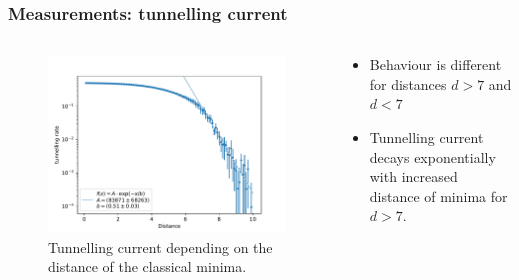 \documentclass[aspectratio=169]{beamer}
\begin{document}
\begin{frame}
	\frametitle{Measurements: tunnelling current}
	\vspace{-15px}
	\begin{columns}
		\begin{column}{0.6\textwidth}
			\begin{figure}[H]
				\centering
				\includegraphics[width=\textwidth]{../imgs/anharmonic_oscillator_lambda_parameter/track_100001000_tunnelling_current_log_fit.pdf}
				\caption{Tunnelling current depending on the distance of the classical minima.}
				\label{fig:anharmonic_oscillator_tunnelling_current}
			\end{figure}
		\end{column}
		\begin{column}{0.39\textwidth}
			\begin{itemize}
				\item Behaviour is different for distances $d > 7$ and $d < 7$
				\item Tunnelling current decays exponentially with increased distance of minima for $d > 7$.
			\end{itemize}
		\end{column}
	\end{columns}
\end{frame}
\end{document}
